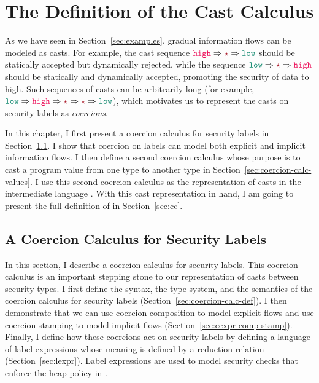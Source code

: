 \chapter{The Definition of the Cast Calculus \CC}
\label{ch:sem}


As we have seen in Section~\ref{sec:examples}, gradual information flows can be
modeled as casts. For example, the cast sequence $\high \Rightarrow \unk
\Rightarrow \low$ should be statically accepted but dynamically rejected, while
the sequence $\low \Rightarrow \unk \Rightarrow \high$ should be statically and
dynamically accepted, promoting the security of data to high. Such sequences of
casts can be arbitrarily long (for example, $\low \Rightarrow \high \Rightarrow
\unk \Rightarrow \unk \Rightarrow \low$), which motivates us to represent the
casts on security labels as \textit{coercions}.

In this chapter, I first present a coercion calculus for security labels in
Section~\ref{sec:coercion-calc-labels}. I show that coercion on labels can model
both explicit and implicit information flows. I then define a second coercion
calculus whose purpose is to cast a program value from one type to another type
in Section~\ref{sec:coercion-calc-values}. I use this second coercion calculus
as the representation of casts in the intermediate language \CC. With this cast
representation in hand, I am going to present the full definition of \CC in
Section~\ref{sec:cc}.

\section{A Coercion Calculus for Security Labels}
\label{sec:coercion-calc-labels}

In this section, I describe a coercion calculus for security labels. This
coercion calculus is an important stepping stone to our representation of casts
between security types. I first define the syntax, the type system, and the
semantics of the coercion calculus for security labels
(Section~\ref{sec:coercion-calc-def}). I then demonstrate that we can use
coercion composition to model explicit flows and use coercion stamping to model
implicit flows (Section~\ref{sec:cexpr-comp-stamp}). Finally, I define how these
coercions act on security labels by defining a language of label expressions
whose meaning is defined by a reduction relation (Section~\ref{sec:lexpr}).
Label expressions are used to model security checks that enforce the heap policy
in \CC.

